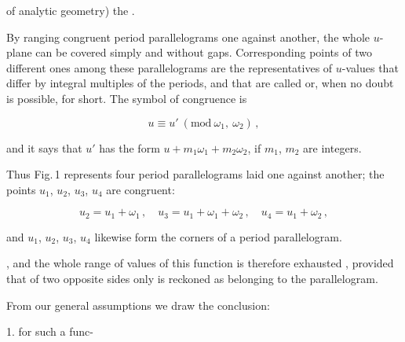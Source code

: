 
of analytic geometry) the .

By ranging congruent period parallelograms one against another,
the whole $u$-plane can be covered simply and without gaps.
Corresponding points of two different ones among these parallelograms
are the representatives of $u$-values that differ by integral
multiples of the periods, and that are called  or, when no doubt is possible,
 for short. The symbol of congruence is

\[ u \equiv u' \ (\mathrm{mod}\ \omega_1,\ \omega_2)\,, \]

and it says that $u'$ has the form $u+m_1\omega_1+m_2\omega_2$, if $m_1$, $m_2$
are integers.


Thus Fig.\,1 represents four period parallelograms laid one against
another; the points $u_1$, $u_2$, $u_3$, $u_4$ are congruent:

\[ u_2 = u_1+\omega_1\,,\quad u_3 = u_1+\omega_1+\omega_2\,,\quad u_4 = u_1+\omega_2\,, \]

and $u_1$, $u_2$, $u_3$, $u_4$ likewise form the corners of a period
parallelogram.

, and the whole range of values of this function is
therefore exhausted , provided
that of two opposite sides only  is reckoned as belonging to
the parallelogram.

From our general assumptions we draw the
conclusion:

1.  for such a func-
